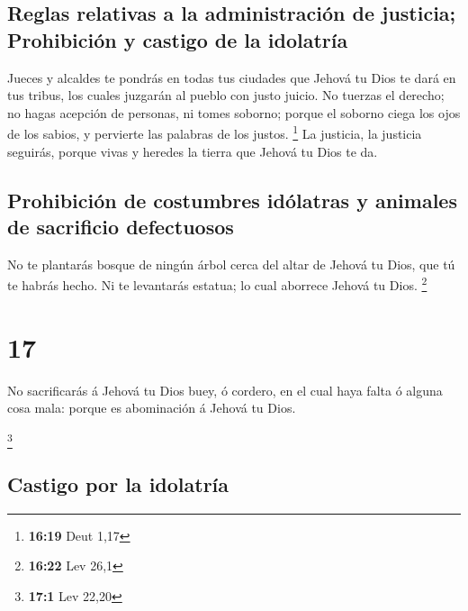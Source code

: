 \hypertarget{reglas-relativas-a-la-administraciuxf3n-de-justicia-prohibiciuxf3n-y-castigo-de-la-idolatruxeda}{%
\subsection{Reglas relativas a la administración de justicia;
Prohibición y castigo de la
idolatría}\label{reglas-relativas-a-la-administraciuxf3n-de-justicia-prohibiciuxf3n-y-castigo-de-la-idolatruxeda}}

 Jueces y alcaldes te pondrás en todas tus ciudades que
Jehová tu Dios te dará en tus tribus, los cuales juzgarán al pueblo con
justo juicio.  No tuerzas el derecho; no hagas acepción de
personas, ni tomes soborno; porque el soborno ciega los ojos de los
sabios, y pervierte las palabras de los justos. \footnote{\textbf{16:19}
  Deut 1,17}  La justicia, la justicia seguirás, porque
vivas y heredes la tierra que Jehová tu Dios te da.

\hypertarget{prohibiciuxf3n-de-costumbres-iduxf3latras-y-animales-de-sacrificio-defectuosos}{%
\subsection{Prohibición de costumbres idólatras y animales de sacrificio
defectuosos}\label{prohibiciuxf3n-de-costumbres-iduxf3latras-y-animales-de-sacrificio-defectuosos}}

 No te plantarás bosque de ningún árbol cerca del altar de
Jehová tu Dios, que tú te habrás hecho.  Ni te levantarás
estatua; lo cual aborrece Jehová tu Dios. \footnote{\textbf{16:22} Lev
  26,1}

\hypertarget{section-16}{%
\section{17}\label{section-16}}

 No sacrificarás á Jehová tu Dios buey, ó cordero, en el
cual haya falta ó alguna cosa mala: porque es abominación á Jehová tu
Dios.

\footnote{\textbf{17:1} Lev 22,20}

\hypertarget{castigo-por-la-idolatruxeda}{%
\subsection{Castigo por la
idolatría}\label{castigo-por-la-idolatruxeda}}


